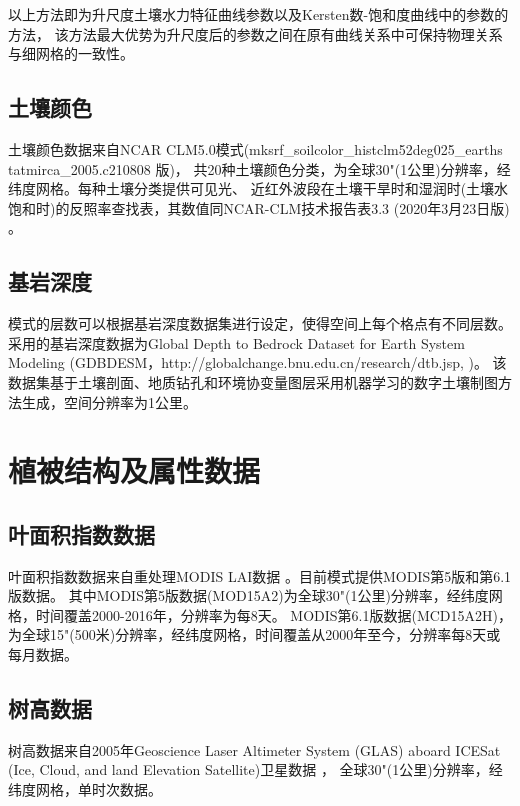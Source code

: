 以上方法即为升尺度土壤水力特征曲线参数以及Kersten数-饱和度曲线中的参数的方法，
该方法最大优势为升尺度后的参数之间在原有曲线关系中可保持物理关系与细网格的一致性。
\subsection{土壤颜色}\label{土壤颜色}

土壤颜色数据来自NCAR CLM5.0模式(mksrf\_soilcolor\_histclm52deg025\_earths\\tatmirca\_2005.c210808 版)，
共20种土壤颜色分类，为全球30"(1公里)分辨率，经纬度网格。每种土壤分类提供可见光、
近红外波段在土壤干旱时和湿润时(土壤水饱和时)的反照率查找表，其数值同NCAR-CLM技术报告表3.3 (2020年3月23日版) \citep{lawrence2018}。


\subsection{基岩深度}\label{基岩深度}

模式的层数可以根据基岩深度数据集进行设定，使得空间上每个格点有不同层数。采用的基岩深度数据为Global Depth to Bedrock Dataset for Earth System Modeling 
(GDBDESM，http://globalchange.bnu.edu.cn/research/dtb.jsp, \citet{shangguan2017mapping})。
该数据集基于土壤剖面、地质钻孔和环境协变量图层采用机器学习的数字土壤制图方法生成，空间分辨率为1公里。


\section{植被结构及属性数据}\label{植被结构及属性数据}
\subsection{叶面积指数数据}\label{叶面积指数数据}
叶面积指数数据来自重处理MODIS LAI数据 \citep{yuan20143d}。目前模式提供MODIS第5版和第6.1版数据。
其中MODIS第5版数据(MOD15A2)为全球30"(1公里)分辨率，经纬度网格，时间覆盖2000-2016年，分辨率为每8天。
MODIS第6.1版数据(MCD15A2H)，为全球15"(500米)分辨率，经纬度网格，时间覆盖从2000年至今，分辨率每8天或每月数据。

\subsection{树高数据}\label{树高数据}
树高数据来自2005年Geoscience Laser Altimeter System (GLAS) aboard ICESat 
(Ice, Cloud, and land Elevation Satellite)卫星数据 \citep{simard2011mapping}，
全球30"(1公里)分辨率，经纬度网格，单时次数据。

